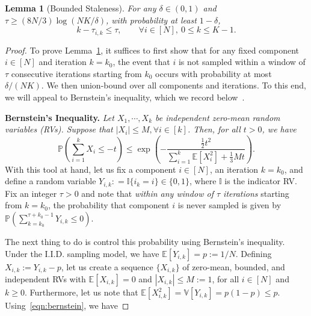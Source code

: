 \documentclass{article}
\theoremstyle{plain}
\newtheorem{lemma}[theorem]{Lemma}
\theoremstyle{definition}
\newcommand{\E}{\mathbb{E}}
\renewcommand{\P}{\mathbb{P}}
\newcommand{\V}{\mathbb{V}}
\newcommand{\bracket}[1]{\left[ #1\right]}
\newcommand{\paren}[1]{\left( #1\right)}
\begin{document}
\begin{lemma}[Bounded Staleness]\label{lem:bounded}
For any $\delta\in(0,1)$ and $\tau\geq (8N/3)\log (NK/\delta)$, with probability at least $1-\delta$,
\begin{equation}
    k-\tau_{i,k}\leq \tau, \qquad \forall i\in[N], \ 0\leq k\leq K-1.
\end{equation}
\end{lemma}
\begin{proof}
To prove Lemma~\ref{lem:bounded}, it suffices to first show that for any fixed component $i\in[N]$ and iteration $k=k_0$, the event that $i$ is not sampled within a window of $\tau$ consecutive iterations starting from $k_0$ occurs with probability at most $\delta/(NK)$. We then union-bound over all components and iterations. To this end, we will appeal to Bernstein's inequality, which we record below~\cite{boucheron2003concentration}.  

\textbf{Bernstein's Inequality.} \textit{Let $X_1,\cdots, X_k$ be independent zero-mean random variables (RVs). Suppose that $|X_i|\leq M, \forall i\in[k]$. Then, for all $t>0$, we have}
\begin{equation}
    \P\paren{\sum_{i=1}^k X_i \leq -t}\le \exp\paren{-\frac{\frac{1}{2}t^2}{\sum_{i=1}^k \E\bracket{X_i^2}+\frac{1}{3}Mt}}.\label{eqn:bernstein}
\end{equation}
With this tool at hand, let us fix a component $i\in[N]$, an iteration $k=k_0$, and define a random variable $Y_{i,k}: = \mathbb{I}\{i_k=i\}\in\{0, 1\}$, where $\mathbb{I}$ is the indicator RV. Fix an integer $\tau>0$ and note that \textit{within any window of $\tau$ iterations} starting from $k=k_0$, the probability that component $i$ is never sampled is given by $\P\paren{\sum_{k=k_0}^{\tau+k_0-1} Y_{i,k}\leq 0}$. 

The next thing to do is control this probability using Bernstein's inequality. Under the I.I.D. sampling model, we have $\E\bracket{Y_{i,k}}=p:=1/N$. Defining  $X_{i,k}:=Y_{i,k}-p$, let us create a sequence $\{X_{i,k}\}$ of zero-mean, bounded, and independent RVs with $\E[X_{i,k}]=0$ and $|X_{i,k}|\leq M:=1$, for all $i\in[N]$ and $k\geq 0$. Furthermore, let us note that  $\E[X_{i,k}^2]=\V[Y_{i,k}]=p(1-p)\leq p$. Using~\eqref{eqn:bernstein}, we have 


\end{proof}
\end{document}
